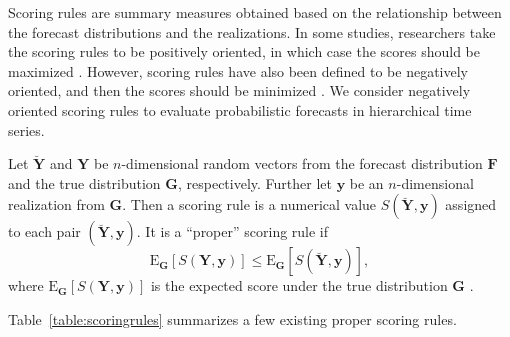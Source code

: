 \documentclass[a4paper, 11pt]{article}
\def\E{\text{E}}
\begin{document}
Scoring rules are summary measures obtained based on the relationship between the forecast distributions and the realizations. In some studies, researchers take the scoring rules to be positively oriented, in which case the scores should be maximized \citep{Gneiting2007}. However, scoring rules have also been defined to be negatively oriented, and then the scores should be minimized \citep{Gneiting2014}. We consider negatively oriented scoring rules to evaluate probabilistic forecasts in hierarchical time series.

Let $\breve{\bm{Y}}$ and $\bm{Y}$ be $n$-dimensional random vectors from the forecast distribution $\bm{F}$ and the true distribution $\bm{G}$, respectively. Further let $\bm{y}$ be an $n$-dimensional realization from $\bm{G}$. Then a scoring rule is a numerical value $S(\breve{\bm{Y}},\bm{y})$ assigned to each pair $(\breve{\bm{Y}},\bm{y})$. It is a ``proper'' scoring rule if 
\begin{equation}\label{eq:(3.1.)}
\E_{\bm{G}}[S(\bm{Y},\bm{y})] \le \E_{\bm{G}}[S(\breve{\bm{Y}},\bm{y})],
\end{equation}
where $\E_{\bm{G}}[S(\bm{Y,y})]$ is the expected score under the true distribution $\bm{G}$ \citep{Gneiting2008, Gneiting2014}.

Table~\ref{table:scoringrules} summarizes a few existing proper scoring rules.
\end{document}
